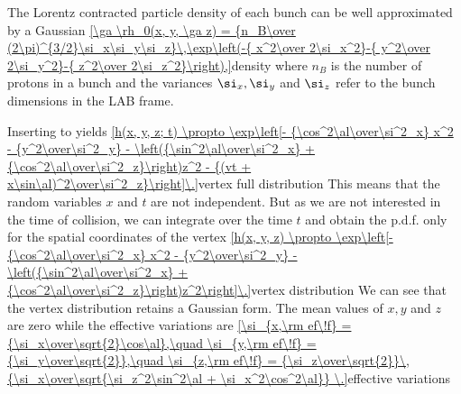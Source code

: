 The Lorentz contracted particle density of each bunch can be well approximated by a Gaussian
\eqref{\ga \rh_0(x, y, \ga z) = {n_B\over (2\pi)^{3/2}\si_x\si_y\si_z}\,\exp\left(-{ x^2\over 2\si_x^2}-{ y^2\over 2\si_y^2}-{ z^2\over 2\si_z^2}\right),}{density}
where $n_B$ is the number of protons in a bunch and the variances $\si_x, \si_y$ and $\si_z$ refer to the bunch dimensions in the LAB frame.

Inserting  to  yields
\eqref{h(x, y, z; t) \propto \exp\left[- {\cos^2\al\over\si^2_x} x^2 - {y^2\over\si^2_y} - \left({\sin^2\al\over\si^2_x} + {\cos^2\al\over\si^2_z}\right)z^2 - {(vt + x\sin\al)^2\over\si^2_z}\right]\.}{vertex full distribution}
This means that the random variables $x$ and $t$ are not independent. But as we are not interested in the time of collision, we can integrate over the time $t$ and obtain the \hbox{p.d.f.} only for the spatial coordinates of the vertex
\eqref{h(x, y, z) \propto \exp\left[- {\cos^2\al\over\si^2_x} x^2 - {y^2\over\si^2_y} - \left({\sin^2\al\over\si^2_x} + {\cos^2\al\over\si^2_z}\right)z^2\right]\.}{vertex distribution}
We can see that the vertex distribution retains a Gaussian form. The mean values of $x, y$ and $z$ are zero while the effective variations are
\eqref{\si_{x,\rm ef\!f} = {\si_x\over\sqrt{2}\cos\al},\quad \si_{y,\rm ef\!f} = {\si_y\over\sqrt{2}},\quad \si_{z,\rm ef\!f} = {\si_z\over\sqrt{2}}\,{\si_x\over\sqrt{\si_z^2\sin^2\al + \si_x^2\cos^2\al}} \.}{effective variations}
